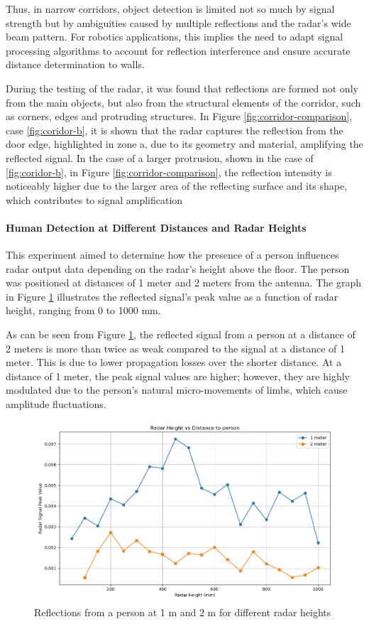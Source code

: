 Thus, in narrow corridors, object detection is limited not so much by signal strength but by ambiguities caused by multiple reflections and the radar’s wide beam pattern. For robotics applications, this implies the need to adapt signal processing algorithms to account for reflection interference and ensure accurate distance determination to walls.

During the testing of the radar, it was found that reflections are formed not only from the main objects, but also from the structural elements of the corridor, such as corners, edges and protruding structures. In Figure \ref{fig:corridor-comparison}, case \ref{fig:coridor-b}, it is shown that the radar captures the reflection from the door edge, highlighted in zone a, due to its geometry and material, amplifying the reflected signal. In the case of a larger protrusion, shown in the case of  \ref{fig:coridor-b}, in Figure \ref{fig:corridor-comparison}, the reflection intensity is noticeably higher due to the larger area of the reflecting surface and its shape, which contributes to signal amplification

\paragraph{Human Detection at Different Distances and Radar Heights}  
This experiment aimed to determine how the presence of a person influences radar output data depending on the radar’s height above the floor. The person was positioned at distances of 1 meter and 2 meters from the antenna. The graph in Figure \ref{fig:floor-human} illustrates the reflected signal’s peak value as a function of radar height, ranging from 0 to 1000 mm.  

As can be seen from Figure \ref{fig:floor-human}, the reflected signal from a person at a distance of 2 meters is more than twice as weak compared to the signal at a distance of 1 meter. This is due to lower propagation losses over the shorter distance. At a distance of 1 meter, the peak signal values are higher; however, they are highly modulated due to the person's natural micro-movements of limbs, which cause amplitude fluctuations.
\begin{figure}[H]
        \centering
    \includegraphics[width=0.8\linewidth]{Src/images/radar flor men.png}
    \caption{Reflections from a person at 1 m and 2 m for different radar heights }
    \label{fig:floor-human}
\end{figure}

